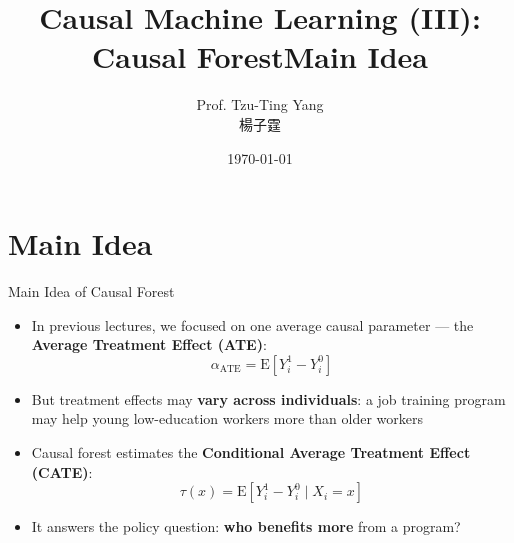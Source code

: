 \documentclass[hyperref={pdfpagelabels=false}]{beamer}
\title[Causal Forest]{Causal Machine Learning (III): Causal Forest}
\author 
{Prof. Tzu-Ting Yang  \\ 楊子霆}
\institute{Institute of Economics, Academia Sinica  \\ 中央研究院經濟研究所}
\date
{\today}
\begin{document}
\begin{frame}
  \titlepage
\end{frame}

\title[]
{Main Idea}

\subtitle{}
\author{}
\institute{}
\date{}

\begin{frame}{}
  \titlepage
\end{frame}

\section{Main Idea}

\begin{frame}{Main Idea of Causal Forest}{}
\begin{itemize}
  \item In previous lectures, we focused on one average causal parameter --- the \textbf{Average Treatment Effect (ATE)}:
  \[
    \alpha_{\text{ATE}} = \mathrm{E}\!\left[Y_i^1 - Y_i^0\right]
  \]
  \vspace{0.2cm}
  \item But treatment effects may \textbf{vary across individuals}: a job training program may help young low-education workers more than older workers
  \vspace{0.2cm}
  \item Causal forest estimates the \textbf{Conditional Average Treatment Effect (CATE)}:
  \[
    \tau(x) = \mathrm{E}\!\left[Y_i^1 - Y_i^0 \mid X_i = x\right]
  \]
  \vspace{0.2cm}
  \item It answers the policy question: \textbf{who benefits more} from a program?
\end{itemize}
\end{frame}
\end{document}
